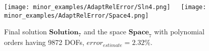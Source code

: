 \begin{figure}[H]
\begin{center}
\texttt{[image: minor\_examples/AdaptRelError/Sln4.png]}\ \ \ 
\texttt{[image: minor\_examples/AdaptRelError/Space4.png]}
\end{center}

\caption{Final solution $\mathbf{Solution}_7$ and the space $\mathbf{Space}_7$ with polynomial orders having 9872 DOFs, $error_{estimate} = 2.32\%$.}
\end{figure}
